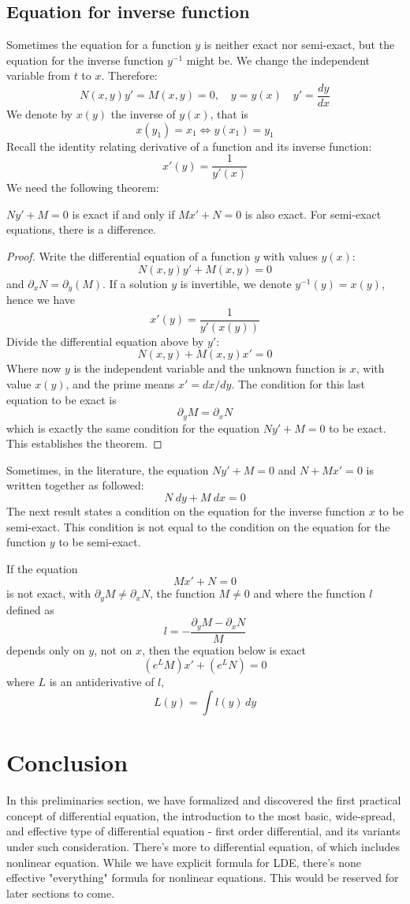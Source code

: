 \subsection{Equation for inverse function}
Sometimes the equation for a function $y$ is neither exact nor semi-exact, but the equation for the inverse function $y^{-1}$ might be. We change the independent variable from $t$ to $x$. Therefore: 
$$N(x,y)y'=M(x,y)=0,\quad y=y(x)\quad y'=\frac{dy}{dx}$$
We denote by $x(y)$ the inverse of $y(x)$, that is $$x(y_{1})=x_{1}\iff y(x_{1})=y_{1}$$
Recall the identity relating derivative of a function and its inverse function: 
$$x'(y)=\frac{1}{y'(x)}$$
We need the following theorem: 
\begin{theorem}
    $Ny'+M=0$ is exact if and only if $Mx'+N=0$ is also exact. For semi-exact equations, there is a difference. 
\end{theorem}
\begin{proof}
    Write the differential equation of a function $y$ with values $y(x)$: 
$$N(x,y)y'+M(x,y)=0$$
and $\partial_{x}N=\partial_{y}(M)$.
If a solution $y$ is invertible, we denote $y^{-1}(y)=x(y)$, hence we have $$x'(y)=\frac{1}{y'(x(y))}$$
Divide the differential equation above by $y'$: 
$$N(x,y)+M(x,y)x'=0$$
Where now $y$ is the independent variable and the unknown function is $x$, with value $x(y)$, and the prime means $x'=dx/dy$. The condition for this last equation to be exact is $$\partial_{y}M=\partial_{x}N$$
which is exactly the same condition for the equation $Ny'+M=0$ to be exact. This establishes the theorem. 
\end{proof}
Sometimes, in the literature, the equation $Ny'+M=0$ and $N+Mx'=0$ is written together as followed:
$$N\: dy+M\:dx=0$$
The next result states a condition on the equation for the inverse function $x$ to be semi-exact. This condition is not equal to the condition on the equation for the function $y$ to be semi-exact.
\begin{theorem}
    If the equation $$Mx'+N=0$$
is not exact, with $\partial_{y}M\neq \partial_{x}N$, the function $M\neq 0$ and where the function $l$ defined as $$l=-\frac{\partial_{y}M-\partial_{x}N}{M}$$
depends only on $y$, not on $x$, then the equation below is exact $$(e^{L}M)x'+(e^{L}N)=0$$
where $L$ is an antiderivative of $l$, $$L(y)=\int l(y) \, dy $$
\end{theorem}
\section{Conclusion}

In this preliminaries section, we have formalized and discovered the first practical concept of differential equation, the introduction to the most basic, wide-spread, and effective type of differential equation - first order differential, and its variants under such consideration. There's more to differential equation, of which includes nonlinear equation. While we have explicit formula for LDE, there's none effective "everything" formula for nonlinear equations. This would be reserved for later sections to come. 